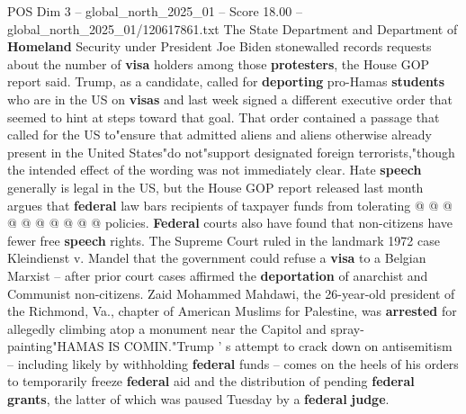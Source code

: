 \begin{textsample}{POS Dim 3 – global\_north\_2025\_01 – Score 18.00 – global\_north\_2025\_01/120617861.txt}
The State Department and Department of \textbf{Homeland} Security under President Joe Biden stonewalled records requests about the number of \textbf{visa} holders among those \textbf{protesters}, the House GOP report said.
Trump, as a candidate, called for \textbf{deporting} pro-Hamas \textbf{students} who are in the US on \textbf{visas} and last week signed a different executive order that seemed to hint at steps toward that goal.
That order contained a passage that called for the US to"ensure that admitted aliens and aliens otherwise already present in the United States"do not"support designated foreign terrorists,"though the intended effect of the wording was not immediately clear.
Hate \textbf{speech} generally is legal in the US, but the House GOP report released last month argues that \textbf{federal} law bars recipients of taxpayer funds from tolerating @ @ @ @ @ @ @ @ @ @ policies. \textbf{Federal} courts also have found that non-citizens have fewer free \textbf{speech} rights.
The Supreme Court ruled in the landmark 1972 case Kleindienst v.
Mandel that the government could refuse a \textbf{visa} to a Belgian Marxist -- after prior court cases affirmed the \textbf{deportation} of anarchist and Communist non-citizens.
Zaid Mohammed Mahdawi, the 26-year-old president of the Richmond, Va., chapter of American Muslims for Palestine, was \textbf{arrested} for allegedly climbing atop a monument near the Capitol and spray-painting"HAMAS IS COMIN."Trump ' s attempt to crack down on antisemitism -- including likely by withholding \textbf{federal} funds -- comes on the heels of his orders to temporarily freeze \textbf{federal} aid and the distribution of pending \textbf{federal} \textbf{grants}, the latter of which was paused Tuesday by a \textbf{federal} \textbf{judge}.

\end{textsample}

